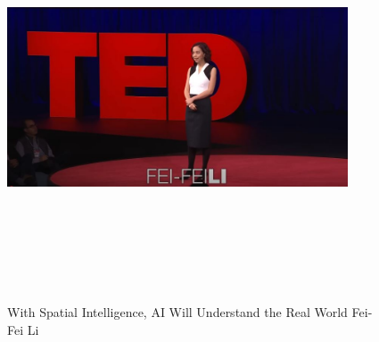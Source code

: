 \documentclass[a4paper,12pt]{article}
\begin{document}
\newpage
\vspace*{1cm} %
\begin{figure}[h]
	\centering
	\vspace{-10pt} %
	\includegraphics[width=0.9\textwidth, height=12cm, keepaspectratio]{../Talks Blogs/With Spatial Intelligence, AI Will Understand the Real World - Fei-Fei Li - TED}
	\vspace{-5pt} %
	\caption{With Spatial Intelligence, AI Will Understand the Real World Fei-Fei Li}
	\vspace{-10pt}
\end{figure}
\end{document}

